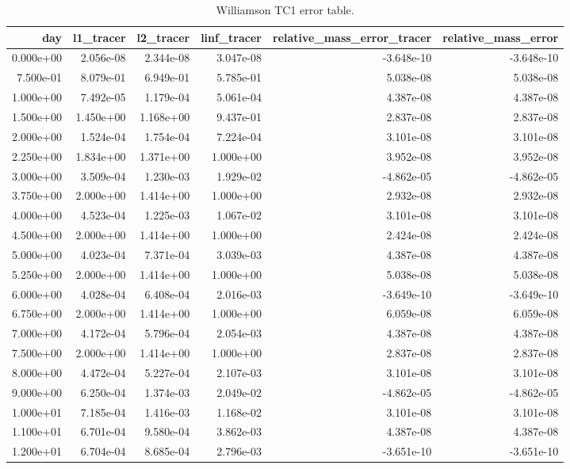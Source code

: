 \begin{table}[htbp]
\centering
{}
\begin{tabular}{rrrrrr}
\toprule
day & l1\_tracer & l2\_tracer & linf\_tracer & relative\_mass\_error\_tracer & relative\_mass\_error \\
\midrule
0.000e+00 & 2.056e-08 & 2.344e-08 & 3.047e-08 & -3.648e-10 & -3.648e-10 \\
7.500e-01 & 8.079e-01 & 6.949e-01 & 5.785e-01 & 5.038e-08 & 5.038e-08 \\
1.000e+00 & 7.492e-05 & 1.179e-04 & 5.061e-04 & 4.387e-08 & 4.387e-08 \\
1.500e+00 & 1.450e+00 & 1.168e+00 & 9.437e-01 & 2.837e-08 & 2.837e-08 \\
2.000e+00 & 1.524e-04 & 1.754e-04 & 7.224e-04 & 3.101e-08 & 3.101e-08 \\
2.250e+00 & 1.834e+00 & 1.371e+00 & 1.000e+00 & 3.952e-08 & 3.952e-08 \\
3.000e+00 & 3.509e-04 & 1.230e-03 & 1.929e-02 & -4.862e-05 & -4.862e-05 \\
3.750e+00 & 2.000e+00 & 1.414e+00 & 1.000e+00 & 2.932e-08 & 2.932e-08 \\
4.000e+00 & 4.523e-04 & 1.225e-03 & 1.067e-02 & 3.101e-08 & 3.101e-08 \\
4.500e+00 & 2.000e+00 & 1.414e+00 & 1.000e+00 & 2.424e-08 & 2.424e-08 \\
5.000e+00 & 4.023e-04 & 7.371e-04 & 3.039e-03 & 4.387e-08 & 4.387e-08 \\
5.250e+00 & 2.000e+00 & 1.414e+00 & 1.000e+00 & 5.038e-08 & 5.038e-08 \\
6.000e+00 & 4.028e-04 & 6.408e-04 & 2.016e-03 & -3.649e-10 & -3.649e-10 \\
6.750e+00 & 2.000e+00 & 1.414e+00 & 1.000e+00 & 6.059e-08 & 6.059e-08 \\
7.000e+00 & 4.172e-04 & 5.796e-04 & 2.054e-03 & 4.387e-08 & 4.387e-08 \\
7.500e+00 & 2.000e+00 & 1.414e+00 & 1.000e+00 & 2.837e-08 & 2.837e-08 \\
8.000e+00 & 4.472e-04 & 5.227e-04 & 2.107e-03 & 3.101e-08 & 3.101e-08 \\
9.000e+00 & 6.250e-04 & 1.374e-03 & 2.049e-02 & -4.862e-05 & -4.862e-05 \\
1.000e+01 & 7.185e-04 & 1.416e-03 & 1.168e-02 & 3.101e-08 & 3.101e-08 \\
1.100e+01 & 6.701e-04 & 9.580e-04 & 3.862e-03 & 4.387e-08 & 4.387e-08 \\
1.200e+01 & 6.704e-04 & 8.685e-04 & 2.796e-03 & -3.651e-10 & -3.651e-10 \\
\bottomrule
\end{tabular}
\caption{Williamson TC1 error table.}
\end{table}
